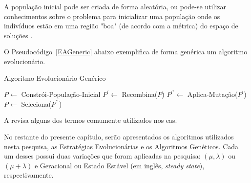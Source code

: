 A população inicial pode ser criada de forma aleatória, ou pode-se utilizar 
conhecimentos sobre o problema para inicializar uma população onde os indivíduos 
estão em uma região "boa" (de acordo com a métrica) do espaço de soluções 
\citep{Luke2013Metaheuristics}.

O Pseudocódigo~\ref{EAGeneric} abaixo exemplifica de forma genérica um algoritmo 
evolucionário.

\begin{algorithm}                      %
	\caption{Algoritmo Evolucionário Genérico}          %
	\label{EAGeneric}                           %
	\begin{algorithmic}                    %
		\State $P \gets $ Constrói-População-Inicial
		\Repeat
			\State $P^{\prime} \gets $ Recombina($P$)
			\State $P^{\prime \prime} \gets $ Aplica-Mutação($P^{\prime}$)
			\State $P \gets $ Seleciona($P^{\prime \prime}$)
		\EndProcedure
	\end{algorithmic}
\end{algorithm}

A  revisa alguns dos termos comumente utilizados nos 
\acp{ea}.

No restante do presente capítulo, serão apresentados os algoritmos utilizados 
nesta pesquisa, as Estratégias Evolucionárias e os Algoritmos Genéticos. Cada 
um desses possui duas variações que foram aplicadas na pesquisa: 
$( \mu,\lambda )$ ou $( \mu + \lambda )$ e Geracional ou Estado Estável 
(em inglês, \textit{steady state}), respectivamente.

